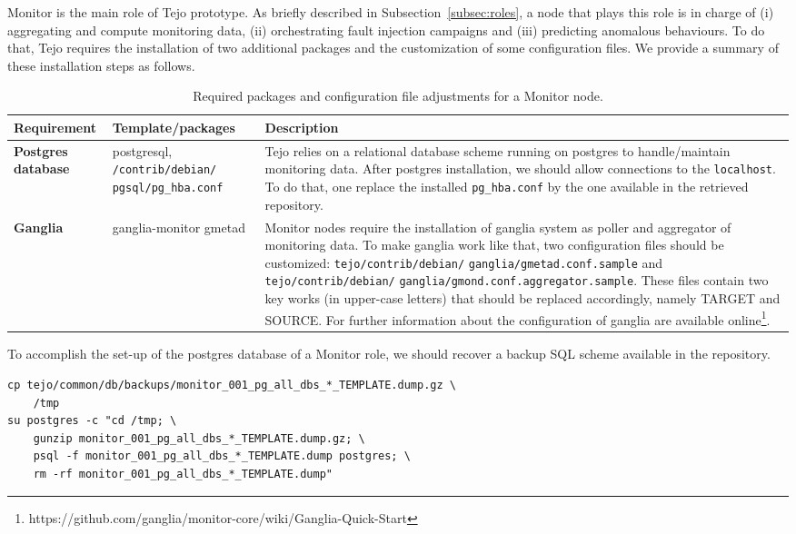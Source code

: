 Monitor is the main role of Tejo prototype. As briefly described in Subsection~\ref{subsec:roles}, a node that plays this role is in charge of (i) aggregating and compute monitoring data, (ii) orchestrating fault injection campaigns and (iii) predicting anomalous behaviours. To do that, Tejo requires the installation of two additional packages and the customization of some configuration files. We provide a summary of these installation steps as follows.

			\begin{table}[htdp]
				\begin{center}
\caption{Required packages and configuration file adjustments for a Monitor node.}
  \label{tab:common_install_conf}
					\begin{tabular}{R{2.5cm} || L{4.5cm} L{6cm} }
						{\bf Requirement}&{\bf Template/packages}&{\bf Description} \\  
						\hline
						\hline
						{\bf Postgres database}& postgresql, \verb|/contrib/debian/| \verb|pgsql/pg_hba.conf|& Tejo relies on a relational database scheme running on postgres to handle/maintain monitoring data. After postgres installation, we should allow connections to the \verb|localhost|. To do that, one replace the installed \verb|pg_hba.conf| by the one available in the retrieved repository.\\
						\hline
						{\bf Ganglia}&ganglia-monitor gmetad & Monitor nodes require the installation of ganglia system as poller and aggregator of monitoring data. To make ganglia work like that, two configuration files should be customized: \verb|tejo/contrib/debian/| \verb|ganglia/gmetad.conf.sample| and \verb|tejo/contrib/debian/| \verb|ganglia/gmond.conf.aggregator.sample|. These files contain two key works (in upper-case letters) that should be replaced accordingly, namely TARGET and SOURCE. For further information about the configuration of ganglia are available online\footnote{https://github.com/ganglia/monitor-core/wiki/Ganglia-Quick-Start}.\\
					\end{tabular}
				\end{center}
			\end{table}

To accomplish the set-up of the postgres database of a Monitor role, we should recover a backup SQL scheme available in the repository.

\begin{lstlisting}
cp tejo/common/db/backups/monitor_001_pg_all_dbs_*_TEMPLATE.dump.gz \
	/tmp
su postgres -c "cd /tmp; \
	gunzip monitor_001_pg_all_dbs_*_TEMPLATE.dump.gz; \
	psql -f monitor_001_pg_all_dbs_*_TEMPLATE.dump postgres; \
	rm -rf monitor_001_pg_all_dbs_*_TEMPLATE.dump"
\end{lstlisting}

